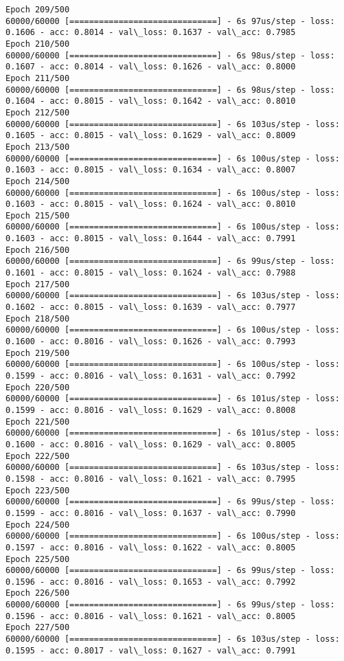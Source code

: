 \documentclass[11pt]{article}
\begin{document}
\begin{Verbatim}[commandchars=\\\{\}]
Epoch 209/500
60000/60000 [==============================] - 6s 97us/step - loss: 0.1606 - acc: 0.8014 - val\_loss: 0.1637 - val\_acc: 0.7985
Epoch 210/500
60000/60000 [==============================] - 6s 98us/step - loss: 0.1607 - acc: 0.8014 - val\_loss: 0.1626 - val\_acc: 0.8000
Epoch 211/500
60000/60000 [==============================] - 6s 98us/step - loss: 0.1604 - acc: 0.8015 - val\_loss: 0.1642 - val\_acc: 0.8010
Epoch 212/500
60000/60000 [==============================] - 6s 103us/step - loss: 0.1605 - acc: 0.8015 - val\_loss: 0.1629 - val\_acc: 0.8009
Epoch 213/500
60000/60000 [==============================] - 6s 100us/step - loss: 0.1603 - acc: 0.8015 - val\_loss: 0.1634 - val\_acc: 0.8007
Epoch 214/500
60000/60000 [==============================] - 6s 100us/step - loss: 0.1603 - acc: 0.8015 - val\_loss: 0.1624 - val\_acc: 0.8010
Epoch 215/500
60000/60000 [==============================] - 6s 100us/step - loss: 0.1603 - acc: 0.8015 - val\_loss: 0.1644 - val\_acc: 0.7991
Epoch 216/500
60000/60000 [==============================] - 6s 99us/step - loss: 0.1601 - acc: 0.8015 - val\_loss: 0.1624 - val\_acc: 0.7988
Epoch 217/500
60000/60000 [==============================] - 6s 103us/step - loss: 0.1602 - acc: 0.8015 - val\_loss: 0.1639 - val\_acc: 0.7977
Epoch 218/500
60000/60000 [==============================] - 6s 100us/step - loss: 0.1600 - acc: 0.8016 - val\_loss: 0.1626 - val\_acc: 0.7993
Epoch 219/500
60000/60000 [==============================] - 6s 100us/step - loss: 0.1599 - acc: 0.8016 - val\_loss: 0.1631 - val\_acc: 0.7992
Epoch 220/500
60000/60000 [==============================] - 6s 101us/step - loss: 0.1599 - acc: 0.8016 - val\_loss: 0.1629 - val\_acc: 0.8008
Epoch 221/500
60000/60000 [==============================] - 6s 101us/step - loss: 0.1600 - acc: 0.8016 - val\_loss: 0.1629 - val\_acc: 0.8005
Epoch 222/500
60000/60000 [==============================] - 6s 103us/step - loss: 0.1598 - acc: 0.8016 - val\_loss: 0.1621 - val\_acc: 0.7995
Epoch 223/500
60000/60000 [==============================] - 6s 99us/step - loss: 0.1599 - acc: 0.8016 - val\_loss: 0.1637 - val\_acc: 0.7990
Epoch 224/500
60000/60000 [==============================] - 6s 100us/step - loss: 0.1597 - acc: 0.8016 - val\_loss: 0.1622 - val\_acc: 0.8005
Epoch 225/500
60000/60000 [==============================] - 6s 99us/step - loss: 0.1596 - acc: 0.8016 - val\_loss: 0.1653 - val\_acc: 0.7992
Epoch 226/500
60000/60000 [==============================] - 6s 99us/step - loss: 0.1596 - acc: 0.8016 - val\_loss: 0.1621 - val\_acc: 0.8005
Epoch 227/500
60000/60000 [==============================] - 6s 103us/step - loss: 0.1595 - acc: 0.8017 - val\_loss: 0.1627 - val\_acc: 0.7991

\end{Verbatim}
\end{document}
